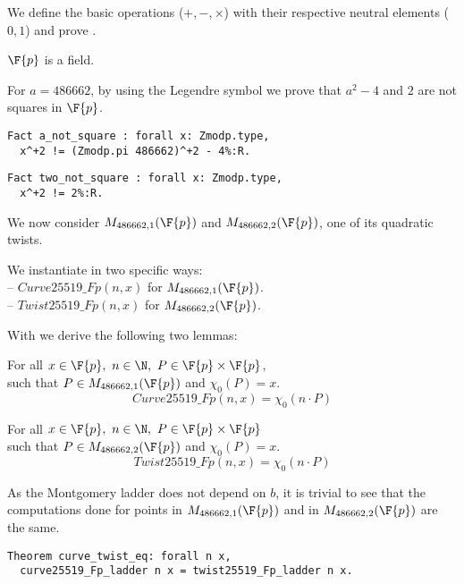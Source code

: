 We define the basic operations ($+, -, \times$) with their respective neutral
elements ($0, 1$) and prove .
\begin{lemma}
  \label{lemma:Zmodp_field}
  $\F{p}$ is a field.
\end{lemma}
For $a = 486662$, by using the Legendre symbol we prove that
$a^2 - 4$ and $2$ are not squares in $\F{p}$.
\begin{lstlisting}[language=Coq,belowskip=-0.25 \baselineskip]
Fact a_not_square : forall x: Zmodp.type,
  x^+2 != (Zmodp.pi 486662)^+2 - 4%:R.
\end{lstlisting}
\begin{lstlisting}[language=Coq,label=two_not_square,belowskip=-0.1 \baselineskip]
Fact two_not_square : forall x: Zmodp.type,
  x^+2 != 2%:R.
\end{lstlisting}
We now consider $M_{486662,1}(\F{p})$ and $M_{486662,2}(\F{p})$, one of its quadratic twists.
\begin{dfn}
We instantiate  in two specific ways:\\
-- $Curve25519\_Fp(n,x)$ for $M_{486662,1}(\F{p})$.\\
-- $Twist25519\_Fp(n,x)$ for $M_{486662,2}(\F{p})$.
\end{dfn}

With  we derive the following two lemmas:
\begin{lemma}
For all $x \in \F{p},\ n \in \N,\ P \in \F{p} \times \F{p}$,\\
such that $P \in M_{486662,1}(\F{p})$ and $\chi_0(P) = x$.
$$Curve25519\_Fp(n,x) = \chi_0(n \cdot P)$$
\end{lemma}
\begin{lemma}
For all $x \in \F{p},\ n \in \N,\ P \in \F{p} \times \F{p}$\\
such that $P \in M_{486662,2}(\F{p})$ and $\chi_0(P) = x$.
$$Twist25519\_Fp(n,x) = \chi_0(n \cdot P)$$
\end{lemma}
As the Montgomery ladder does not depend on $b$, it is trivial to
see that the computations done for points in $M_{486662,1}(\F{p})$ and in
$M_{486662,2}(\F{p})$ are the same.
\begin{lstlisting}[language=Coq]
Theorem curve_twist_eq: forall n x,
  curve25519_Fp_ladder n x = twist25519_Fp_ladder n x.
\end{lstlisting}

